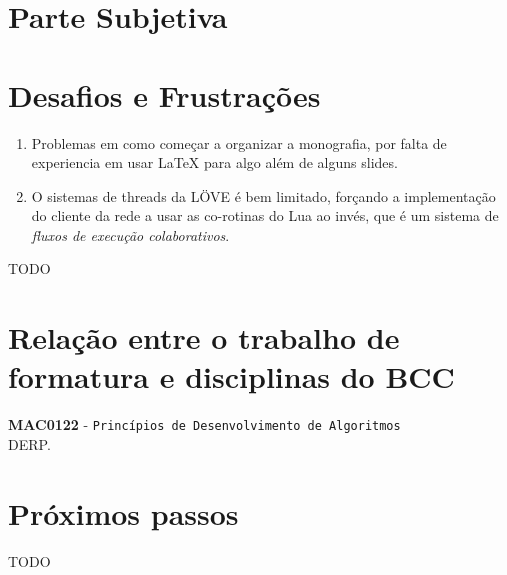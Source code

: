 \chapter*{Parte Subjetiva}
\label{sec:parte_subjetiva}

\chapter{Desafios e Frustrações}
\label{sec:desafios_frustracoes}

    \begin{enumerate}
        \item Problemas em como começar a organizar a monografia, por falta de experiencia em
            usar LaTeX para algo além de alguns slides.
            
        \item O sistemas de threads da LÖVE é bem limitado, forçando a implementação do cliente da rede a usar
            as co-rotinas do Lua ao invés, que é um sistema de \textit{fluxos de execução colaborativos}.
    \end{enumerate}

TODO


\chapter{Relação entre o trabalho de formatura e disciplinas do BCC}
\label{sec:relacao_disciplinas_bcc}
\newcommand\materia[3]{\noindent \textbf{#1} - \texttt{#2}\\\indent #3\vspace{0.5cm}\\}

\materia{MAC0122}{Princípios de Desenvolvimento de Algoritmos}{
    DERP.
}

\chapter{Próximos passos}
\label{sec:proximos_passos}

TODO
